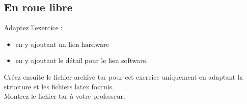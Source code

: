 \subsection{En roue libre}

Adaptez l'exercice :\\
\begin{itemize}
\item en y ajoutant un lien hardware
\item en y ajoutant le détail pour le lien software.
\end{itemize}
Créez ensuite le fichier archive tar pour cet exercice uniquement en adaptant la structure et les fichiers latex fournis.\\
Montrez le fichier tar à votre professeur.
\newpage
